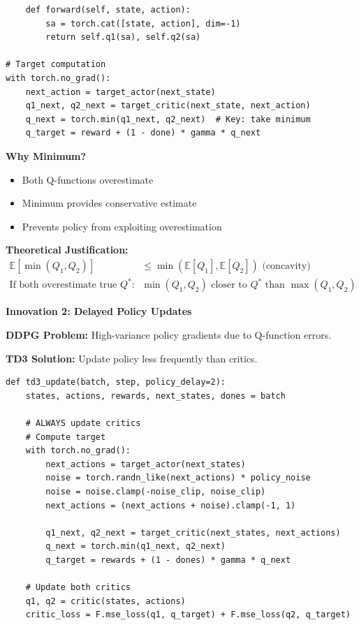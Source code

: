 \documentclass[12pt]{article}
\begin{document}
{{\begin{verbatim}
    def forward(self, state, action):
        sa = torch.cat([state, action], dim=-1)
        return self.q1(sa), self.q2(sa)

# Target computation
with torch.no_grad():
    next_action = target_actor(next_state)
    q1_next, q2_next = target_critic(next_state, next_action)
    q_next = torch.min(q1_next, q2_next)  # Key: take minimum
    q_target = reward + (1 - done) * gamma * q_next
\end{verbatim}

\textbf{Why Minimum?}
\begin{itemize}
\item Both Q-functions overestimate
\item Minimum provides conservative estimate
\item Prevents policy from exploiting overestimation
\end{itemize}

\textbf{Theoretical Justification:}
\begin{align}
\mathbb{E}[\min(Q_1, Q_2)] &\leq \min(\mathbb{E}[Q_1], \mathbb{E}[Q_2]) \text{ (concavity)} \\
\text{If both overestimate true } Q^*: \quad &\min(Q_1, Q_2) \text{ closer to } Q^* \text{ than } \max(Q_1, Q_2)
\end{align}

\textbf{Innovation 2: Delayed Policy Updates}

\textbf{DDPG Problem:} High-variance policy gradients due to Q-function errors.

\textbf{TD3 Solution:} Update policy less frequently than critics.

\begin{verbatim}
def td3_update(batch, step, policy_delay=2):
    states, actions, rewards, next_states, dones = batch
    
    # ALWAYS update critics
    # Compute target
    with torch.no_grad():
        next_actions = target_actor(next_states)
        noise = torch.randn_like(next_actions) * policy_noise
        noise = noise.clamp(-noise_clip, noise_clip)
        next_actions = (next_actions + noise).clamp(-1, 1)
        
        q1_next, q2_next = target_critic(next_states, next_actions)
        q_next = torch.min(q1_next, q2_next)
        q_target = rewards + (1 - dones) * gamma * q_next
    
    # Update both critics
    q1, q2 = critic(states, actions)
    critic_loss = F.mse_loss(q1, q_target) + F.mse_loss(q2, q_target)
    

\end{verbatim}}}
\end{document}

